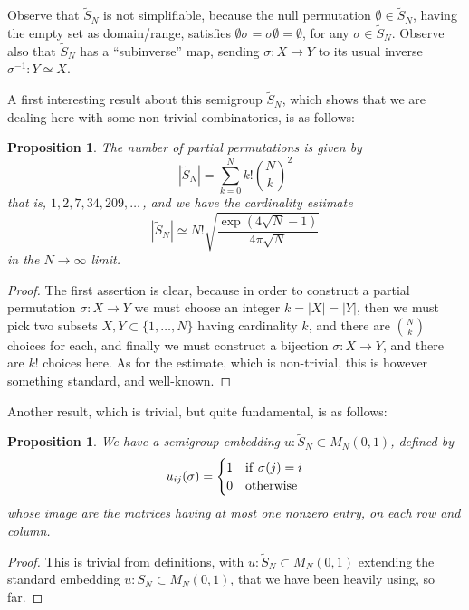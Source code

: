\documentclass[12pt]{amsbook}
\newtheorem{proposition}[theorem]{Proposition}
\begin{document}
Observe that $\widetilde{S}_N$ is not simplifiable, because the null permutation $\emptyset\in\widetilde{S}_N$, having the empty set as domain/range, satisfies $\emptyset\sigma=\sigma\emptyset=\emptyset$, for any $\sigma\in\widetilde{S}_N$. Observe also that $\widetilde{S}_N$ has a ``subinverse'' map, sending $\sigma:X\to Y$ to its usual inverse $\sigma^{-1}:Y\simeq X$.

\bigskip

A first interesting result about this semigroup $\widetilde{S}_N$, which shows that we are dealing here with some non-trivial combinatorics, is as follows:

\begin{proposition}
The number of partial permutations is given by
$$|\widetilde{S}_N|=\sum_{k=0}^Nk!\binom{N}{k}^2$$
that is, $1,2,7,34,209,\ldots\,$, and we have the cardinality estimate
$$|\widetilde{S}_N|\simeq N!\sqrt{\frac{\exp(4\sqrt{N}-1)}{4\pi\sqrt{N}}}$$
in the $N\to\infty$ limit.
\end{proposition}

\begin{proof}
The first assertion is clear, because in order to construct a partial permutation $\sigma:X\to Y$ we must choose an integer $k=|X|=|Y|$, then we must pick two subsets $X,Y\subset\{1,\ldots,N\}$ having cardinality $k$, and there are $\binom{N}{k}$ choices for each, and finally we must construct a bijection $\sigma:X\to Y$, and there are $k!$ choices here. As for the estimate, which is non-trivial, this is however something standard, and well-known.
\end{proof}

Another result, which is trivial, but quite fundamental, is as follows:

\begin{proposition}
We have a semigroup embedding $u:\widetilde{S}_N\subset M_N(0,1)$, defined by 
$$u_{ij}(\sigma)=
\begin{cases}
1&{\rm if}\ \sigma(j)=i\\
0&{\rm otherwise}
\end{cases}$$
whose image are the matrices having at most one nonzero entry, on each row and column.
\end{proposition}

\begin{proof}
This is trivial from definitions, with $u:\widetilde{S}_N\subset M_N(0,1)$ extending the standard embedding $u:S_N\subset M_N(0,1)$, that we have been heavily using, so far.
\end{proof}
\end{document}
